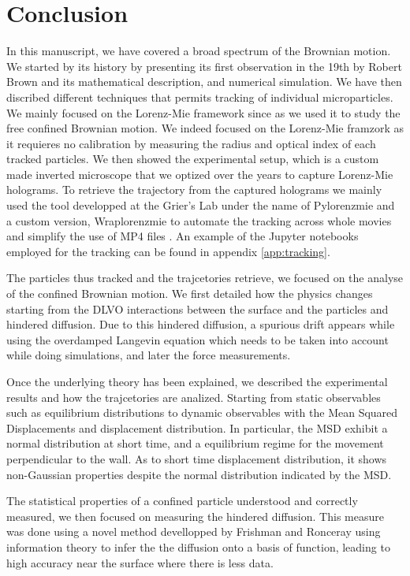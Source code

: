 \section{Conclusion}

In this manuscript, we have covered a broad spectrum of the Brownian motion. We started by its history by presenting its first observation in the 19th by Robert Brown and its mathematical description, and numerical simulation. We have then discribed different techniques that permits tracking of individual microparticles. We mainly focused on the Lorenz-Mie framework since as we used it to study the free confined Brownian motion. We indeed focused on the Lorenz-Mie framzork as it requieres no calibration by measuring the radius and optical index of each tracked particles. We then showed the experimental setup, which is a custom made inverted microscope that we optized over the years to capture Lorenz-Mie holograms. To retrieve the trajectory from the captured holograms we mainly used the tool developped at the Grier's Lab under the name of Pylorenzmie \href{https://github.com/davidgrier/pylorenzmie}{\faGithub} and a custom version, Wraplorenzmie to automate the tracking across whole movies and simplify the use of MP4 files \href{https://github.com/eXpensia/wraplorenzmie}{\faGithub}. An example of the Jupyter notebooks employed for the tracking can be found in appendix \ref{app:tracking}.

The particles thus tracked and the trajcetories retrieve, we focused on the analyse of the confined Brownian motion. We first detailed how the physics changes starting from the DLVO interactions between the surface and the particles and hindered diffusion. Due to this hindered diffusion, a spurious drift appears while using the overdamped Langevin equation which needs to be taken into account while doing simulations, and later the force measurements.

Once the underlying theory has been explained, we described the experimental results and how the trajcetories are analized. Starting from static observables such as equilibrium distributions to dynamic observables with the Mean Squared Displacements and displacement distribution. In particular, the \gls{MSD} exhibit a normal distribution at short time, and a equilibrium regime for the movement perpendicular to the wall. As to short time displacement distribution, it shows non-Gaussian properties despite the normal distribution indicated by the \gls{MSD}.

The statistical properties of a confined particle understood and correctly measured, we then focused on measuring the hindered diffusion. This measure was done using a novel method devellopped by Frishman and Ronceray \cite{frishman_learning_2020} using information theory to infer the the diffusion onto a basis of function, leading to high accuracy near the surface where there is less data. 

